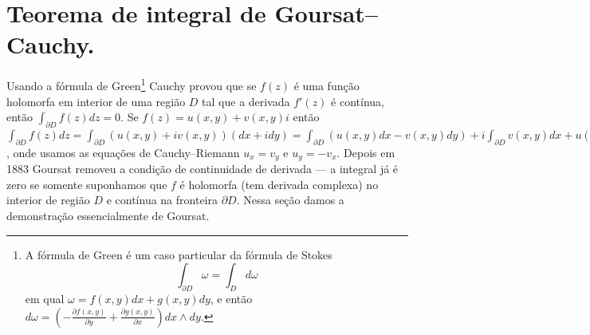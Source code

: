 \begin{defin}
\end{defin}

\begin{exem}
\end{exem}

\begin{teorema}
\end{teorema}

\section{Teorema de integral de Goursat--Cauchy.}

\begin{remark}
Usando a fórmula de Green\footnote{
A fórmula de Green é um caso particular da fórmula de Stokes 
$$\int_{\partial D} \omega = \int_D d\omega$$
em qual $\omega = f(x,y) dx + g(x,y) dy$, e então
$d\omega = (-\frac{\partial f(x,y)}{\partial y} + \frac{\partial g(x,y)}{\partial x}) dx\wedge dy$.}
Cauchy provou que se $f(z)$ é uma função holomorfa em interior de uma região $D$
tal que a derivada $f'(z)$ é contínua, então $\int_{\partial D} f(z) dz = 0$.
Se $f(z) = u(x,y) + v(x,y) i$ então
$\int_{\partial D} f(z) dz = \int_{\partial D} (u(x,y) + i v(x,y)) (dx + i dy)
= \int_{\partial D} (u(x,y) dx - v(x,y) dy) + i \int_{\partial D} v(x,y) dx + u(x,y) dy =
= \int_D (-u_y-v_x) dx dy + i \int_D (-v_y + u_x) dx dy = \int_D 0 + i \int_D 0 = 0$,
onde usamos as equações de Cauchy--Riemann $u_x = v_y$ e $u_y = - v_x$.
Depois em 1883 Goursat removeu a condição de continuidade de derivada ---
a integral já é zero se somente suponhamos que $f$ é holomorfa
(tem derivada complexa) no interior de região $D$ e contínua na fronteira $\partial D$.
Nessa seção damos a demonstração essencialmente de Goursat.
\end{remark}

